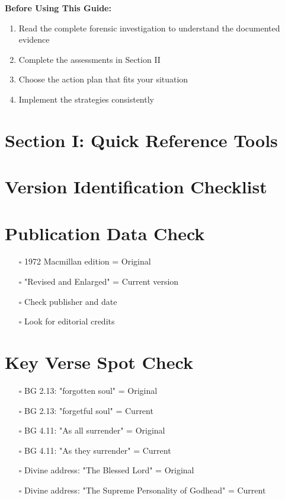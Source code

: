 \documentclass[11pt,twoside]{book}
\begin{document}
\textbf{\textbf{Before Using This Guide:}}
\begin{enumerate}
\item Read the complete forensic investigation to understand the documented evidence
\item Complete the assessments in Section II
\item Choose the action plan that fits your situation
\item Implement the strategies consistently
\end{enumerate}
\section*{Section I: Quick Reference Tools}
\label{sec:org4959764}

\section*{Version Identification Checklist}
\label{sec:orgc830f77}

\section*{Publication Data Check}
\label{sec:org6896568}
\begin{itemize}
\item[{$\square$}] 1972 Macmillan edition = Original
\item[{$\square$}] "Revised and Enlarged" = Current version
\item[{$\square$}] Check publisher and date
\item[{$\square$}] Look for editorial credits
\end{itemize}
\section*{Key Verse Spot Check}
\label{sec:org700b3e0}
\begin{itemize}
\item[{$\square$}] BG 2.13: "forgotten soul" = Original
\item[{$\square$}] BG 2.13: "forgetful soul" = Current
\item[{$\square$}] BG 4.11: "As all surrender" = Original
\item[{$\square$}] BG 4.11: "As they surrender" = Current
\item[{$\square$}] Divine address: "The Blessed Lord" = Original
\item[{$\square$}] Divine address: "The Supreme Personality of Godhead" = Current
\end{itemize}
\end{document}
